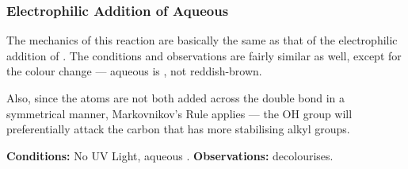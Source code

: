 



		\subsubsection{Electrophilic Addition of Aqueous }

			The mechanics of this reaction are basically the same as that of the electrophilic addition of .
			The conditions and observations are fairly similar as well, except for the colour change --- aqueous
			 is , not reddish-brown.

			Also, since the  atoms are not both added across the double bond in a symmetrical manner,
			Markovnikov's Rule applies --- the OH group will preferentially attack the carbon that has more stabilising alkyl groups.

			\vspace{1.5em}
			\vbox{\textbf{Conditions:}	\tabto{35mm}No UV Light, aqueous .}
			\vbox{\textbf{Observations:}\tabto{35mm}  decolourises.}















